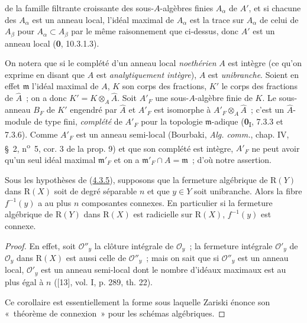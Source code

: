 de la famille filtrante croissante des sous-$A$-algèbres finies $A_\alpha$
de $A'$, et si chacune des $A_\alpha$ est un anneau local, l'idéal maximal
de $A_\alpha$ est la trace sur $A_\alpha$ de celui de $A_\beta$ pour
$A_\alpha\subset A_\beta$ par le même raisonnement que ci-dessus, donc $A'$
est un anneau local (\textbf{0}, 10.3.1.3).

On notera que si le complété d'un anneau local \emph{noethérien} $A$ est intègre
(ce qu'on exprime en disant que $A$ est \emph{analytiquement intègre}), $A$
est \emph{unibranche}. Soient en effet $\mathfrak m$ l'idéal maximal de $A$, $K$
son corps des fractions, $K'$ le corps des fractions de $\widehat A$~; on
a donc
$K'=K\otimes_A\widehat A$.
Soit $A'_F$ une sous-$A$-algèbre finie de $K$. Le sous-anneau $B_F$ de $K'$
engendré par $\widehat A$ et $A'_F$ est isomorphe à
$A'_F\otimes_A\widehat A$~; c'est un $\widehat A$-module de type fini,
\emph{complété} de $A'_F$ pour la topologie $\mathfrak m$-adique
(\textbf{0}\textsubscript{I}, 7.3.3 et 7.3.6). Comme $A'_F$ est un anneau semi-local
(Bourbaki, \emph{Alg. comm.}, chap. IV, \S~2, n\textsuperscript{o}~5,
cor. 3 de la prop. 9) et que son complété est intègre, $A'_F$ ne peut avoir
qu'un seul idéal maximal $\mathfrak m'_F$ et on a
$\mathfrak m'_F\cap A=\mathfrak m$~; d'où notre assertion.

\begin{corollary}[4.3.7]
\label{III.4.3.7-fr}
Sous les hypothèses de \textup{(\hyperref[III.4.3.5-fr]{4.3.5})}, supposons que la
fermeture algébrique de $\mathrm R(Y)$ dans $\mathrm R(X)$ soit de degré
séparable $n$ et que $y\in Y$ soit unibranche. Alors la fibre $f^{-1}(y)$ a
au plus $n$ composantes connexes. En particulier si la fermeture algébrique
de $\mathrm R(Y)$ dans $\mathrm R(X)$ est radicielle sur $\mathrm R(X)$,
$f^{-1}(y)$ est connexe.
\end{corollary}

\begin{proof}
En effet, soit $\mathcal O''_y$ la clôture intégrale de $\mathcal O_y$~; la
fermeture intégrale $\mathcal O'_y$ de $\mathcal O_y$ dans $\mathrm R(X)$
est aussi celle de $\mathcal O''_y$~; mais on sait que si $\mathcal O''_y$ est
un anneau local, $\mathcal O'_y$ est un anneau semi-local dont le nombre
d'idéaux maximaux est au plus égal à $n$ ([13], vol. I, p. 289, th. 22).

Ce corollaire est essentiellement la forme sous laquelle Zariski énonce son
«~théorème de connexion~» pour les schémas algébriques.
\end{proof}

